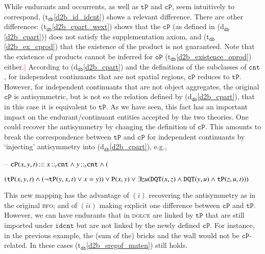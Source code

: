 \documentclass[ao]{iosart2x}
\newcommand{\nb}[1]{\textcolor{red}{$|$}\marginpar{\hspace*{-0cm}\parbox{20mm}{\scriptsize\raggedright\textcolor{red}{#1}}}}
\newcommand{\bflist}{\begin{list}{}{\setlength{\topsep}{2mm}\setlength{\parsep}{0mm}\setlength{\leftmargin}{9.2mm}\setlength{\labelwidth}{8mm}}}
\newcommand{\eflist}{\end{list}}
\newcommand{\bfoAxLabel}{\textrm{a$_\texttt{b}$}}
\newcommand{\dbDefLabel}{\textrm{d$_\texttt{db}$}}
\newcommand{\dbThrLabel}{\textrm{t$_\texttt{db}$}}
\newcommand{\refbfoax}[1]{({\bfoAxLabel}\ref{#1})}
\newcommand{\refdbdf}[1]{({\dbDefLabel}\ref{#1})}
\newcommand{\refdbth}[1]{({\dbThrLabel}\ref{#1})}
\newcommand{\pr}[1]{\mathtt{#1}}
\newcommand{\cn}[1]{\mathtt{#1}}
\newcommand\textequal{%
 \rule[.08ex]{5pt}{0.35pt}\llap{\rule[.78ex]{5pt}{0.35pt}}}
\newcommand{\sdef}{{\hspace{1.5pt}:\hspace{-2.5pt}\textequal\hspace{3pt}}}
\newcommand{\dolce}{{\textsc{dolce}}}
\newcommand{\bfo}{{\textsc{bfo}}}
\newcommand {\TPd} {\ensuremath{\pr{tP}}}
\newcommand {\Pd} {\ensuremath{\pr{P}}}
\newcommand {\DQTd} {\ensuremath{\pr{DQT}}}
\newcommand{\cntbcat}{\cn{cnt}}
\newcommand{\idcntbcat}{\cn{idcnt}}
\newcommand{\bfocpart}{\pr{cP}}
\newcommand{\bfoopart}{\pr{oP}}
\newcommand{\bfoiof}[1]{{\,::_{#1\:\!}}}
\begin{document}
While endurants and occurrents, as well as $\TPd$ and $\bfocpart$, seem intuitively to correspond, \refdbth{d2b_id_idcnt} shows a relevant difference. 
There are other differences: \refdbth{d2b_cpart_wext} shows that the $\bfocpart$ (as defined in \refdbdf{d2b_cpart}) does not satisfy the supplementation axiom, and \refdbth{d2b_ex_cprod} that the existence of the product is not guaranteed. Note that the existence of products cannot be inferred for $\bfoopart$ \refdbth{d2b_existence_oprod} either.\nb{CM: forse portare la nota nel testo e aggiungere i teoremi/assiomi necessari [FC: fatto]} 
According to \refdbdf{d2b_cpart} and the definitions of the subclasses of $\cntbcat$, for independent continuants that are not spatial regions, $\bfocpart$ reduces to $\TPd$. However, for independent continuants that are not object aggregates, the original $\bfocpart$ is antisymmetric, but is not so the relation defined by \refdbdf{d2b_cpart}, that in this case it is equivalent to $\TPd$. As we have seen, this fact has an important impact on the endurant/continuant entities accepted by the two theories. One could recover the antisymmetry by changing the definition of $\bfocpart$. This amounts to break the correspondence between $\TPd$ and $\bfocpart$ for independent continuants by `injecting' antisymmetry into \refdbdf{d2b_cpart}, e.g.,
\bflist
\item[--] $\bfocpart(x,y,t) \sdef x \bfoiof{t} \cntbcat \land y \bfoiof{t} \cntbcat \land ($\parbox[t]{\textwidth} {$(\TPd(x,y,t) \land (\neg \TPd(y,x,t) \lor x=y)) \lor \Pd(x,y) \lor \\ 
\exists zu(\DQTd(x,z) \land \DQTd(y,u) \land \TPd(z,u,t)))$}
\eflist
%
This new mapping has the advantage of $(i)$ recovering the antisymmetry as in the original {\bfo}; and of $(ii)$ making explicit one difference between $\bfocpart$ and  $\TPd$. However, we can have endurants that in {\dolce} are linked by $\TPd$ that are still imported under $\idcntbcat$ but are not linked by the newly defined $\bfocpart$. For instance, in the previous example, the (sum of the) bricks and the wall would not be $\bfocpart$-related. In these cases \refdbth{d2b_sregof_maten} still holds. %
\end{document}
